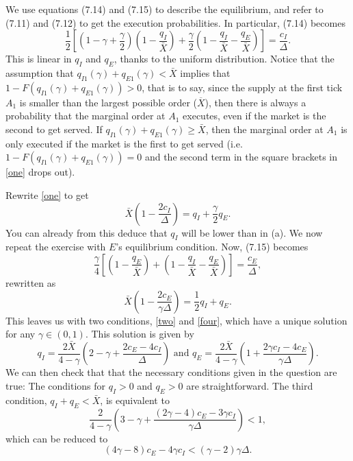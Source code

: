 \documentclass[11pt
, answers
]{exam}
\begin{document}
\begin{enumerate}[label=(\alph*). ]
	\begin{solution}
		We use equations (7.14) and (7.15) to describe the equilibrium, and refer to (7.11) and (7.12) to get the execution probabilities. In particular, (7.14) becomes
		\begin{equation} \label{one}
			\frac{1}{2} \left[ \left( 1-\gamma+\frac{\gamma}{2}\right)\left(1-\frac{q_{I}}{\bar{X}}\right)+\frac{\gamma}{2}\left(1-\frac{q_{I}}{\bar{X}}-\frac{q_{E}}{\bar{X}}\right)\right] = \frac{c_{I}}{\Delta}.
		\end{equation}
		This is linear in $q_{I}$ and $q_{E}$, thanks to the uniform distribution. Notice that the assumption that $q_{I1}(\gamma)+q_{E1}(\gamma)<\bar{X}$ implies that $1-F(q_{I1}(\gamma)+q_{E1}(\gamma))>0$, that is to say, since the supply at the first tick $A_1$ is smaller than the largest possible order ($\overline{X}$), then there is always a probability that the marginal order at $A_1$ executes, even if the market is the second to get served. If $q_{I1}(\gamma)+q_{E1}(\gamma) \ge \bar{X}$, then the marginal order at $A_1$ is only executed if the market is the first to get served (i.e. $1-F(q_{I1}(\gamma)+q_{E1}(\gamma))=0$ and the second term in the square brackets in \eqref{one} drops out).
		
		Rewrite \eqref{one} to get
		\begin{equation} \label{two}
			\bar{X} \left(1-\frac{2c_{I}}{\Delta} \right) = q_{I} + \frac{\gamma}{2} q_{E}.
		\end{equation}
		You can already from this deduce that $q_{I}$ will be lower than in (a). We now repeat the exercise with $E$'s equilibrium condition. Now, (7.15) becomes
		\begin{equation} \label{three}
			\frac{\gamma}{4} \left[ \left(1-\frac{q_{E}}{\bar{X}} \right) + \left(1-\frac{q_{I}}{\bar{X}}-\frac{q_{E}}{\bar{X}}\right)\right] = \frac{c_{E}}{\Delta},
		\end{equation}
		rewritten as
		\begin{equation} \label{four}
			\bar{X}\left(1-\frac{2c_{E}}{\gamma \Delta}\right) = \frac{1}{2} q_{I}+q_{E}.
		\end{equation}
		This leaves us with two conditions, \eqref{two} and \eqref{four}, which have a unique solution for any $\gamma \in (0,1)$. This solution is given by
		\[
		q_{I} = \frac{2 \bar{X}}{4-\gamma} \left(2-\gamma+\frac{2c_{E}-4c_{I}}{\Delta} \right) \text{ and } q_{E}=\frac{2\bar{X}}{4-\gamma}\left(1+\frac{2\gamma c_{I}-4c_{E}}{\gamma \Delta} \right).
		\]
		We can then check that that the necessary conditions given in the question are true: The conditions for $q_{I}>0$ and $q_{E}>0$ are straightforward. The third condition, $q_{I}+q_{E}<\bar{X}$, is equivalent to
		\[
		\frac{2}{4-\gamma} \left(3-\gamma + \frac{(2\gamma-4)c_{E}-3\gamma c_{I}}{\gamma \Delta} \right) < 1,
		\]
		which can be reduced to
		\[
		(4\gamma-8)c_{E} - 4\gamma c_{I} < (\gamma-2) \gamma \Delta.
		\]
	\end{solution}
	

\end{enumerate}
\end{document}
